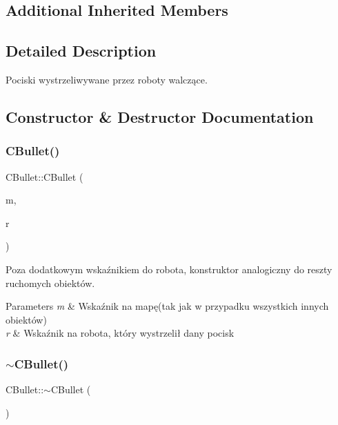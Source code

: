 \subsection*{Additional Inherited Members}


\subsection{Detailed Description}
Pociski wystrzeliwywane przez roboty walczące. 

\subsection{Constructor \& Destructor Documentation}
\mbox{\label{class_c_bullet_a56797cd539f173bbfc8cc9d238734fbc}} 
\subsubsection{\texorpdfstring{C\+Bullet()}{CBullet()}}
{\footnotesize\ttfamily C\+Bullet\+::\+C\+Bullet (\begin{DoxyParamCaption}\item[{\mbox{\hyperlink{class_c_map}{C\+Map}} $\ast$}]{m,  }\item[{\mbox{\hyperlink{class_c_fighting_robot}{C\+Fighting\+Robot}} $\ast$}]{r }\end{DoxyParamCaption})}



Poza dodatkowym wskaźnikiem do robota, konstruktor analogiczny do reszty ruchomych obiektów. 


\begin{DoxyParams}{Parameters}
{\em m} & Wskaźnik na mapę(tak jak w przypadku wszystkich innych obiektów) \\
\hline
{\em r} & Wskaźnik na robota, który wystrzelił dany pocisk \\
\hline
\end{DoxyParams}
\mbox{\label{class_c_bullet_ac3502e35a7797b9d7d0efef288618a71}} 
\subsubsection{\texorpdfstring{$\sim$\+C\+Bullet()}{~CBullet()}}
{\footnotesize\ttfamily C\+Bullet\+::$\sim$\+C\+Bullet (\begin{DoxyParamCaption}{ }\end{DoxyParamCaption})\hspace{0.3cm}{\ttfamily [virtual]}}



